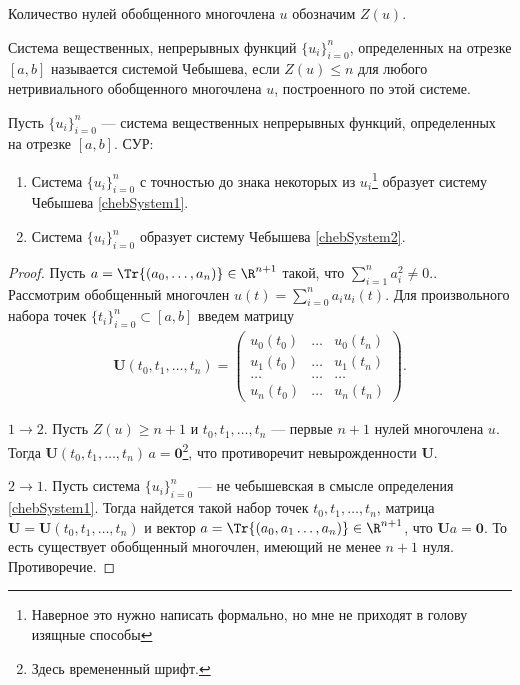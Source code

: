 Количество нулей обобщенного многочлена $u$ обозначим $Z(u)$.
\begin{dfn}[Аксиоматическое]
    \label{chebSystem2}
    Система вещественных, непрерывных функций $\{u_i\}_{i=0}^n$, определенных на отрезке $[a, b]$ называется системой Чебышева,
    если $Z(u) \leqslant n$ для любого нетривиального обобщенного многочлена $u$, построенного по этой системе.
\end{dfn}



\begin{thm}
    \label{chebDefEqual}
    Пусть $\{u_i\}_{i=0}^n$ --- система вещественных непрерывных функций, определенных на отрезке $[a, b]$.
    СУР:
    \begin{enumerate}
        \item Система $\{u_i\}_{i=0}^n$ с точностью до знака некоторых из $u_i$\footnote{\color{blue} Наверное
            это нужно написать формально, но мне не приходят в голову изящные способы}  образует систему Чебышева \ref{chebSystem1}.
        \item Система $\{u_i\}_{i=0}^n$ образует систему Чебышева \ref{chebSystem2}.
    \end{enumerate}
\end{thm}
\begin{proof}
    Пусть $a = \Tr{(a_0, \ldots, a_n)} \in \R^{n + 1}$ такой, что $\sum_{i=1}^n a_i^2 \neq0$..
    Рассмотрим обобщенный многочлен $u(t) = \sum_{i=0}^n a_i u_i(t)$.
    Для произвольного набора точек $\{t_i\}_{i=0}^n \subset [a, b]$ введем матрицу
    \begin{gather*}
        \mathbf U(t_0, t_1, \ldots, t_n) =
        \begin{pmatrix}
            u_0(t_0) & \ldots & u_0(t_n) \\
            u_1(t_0) & \ldots & u_1(t_n) \\
            \ldots & \ldots & \ldots \\
            u_n(t_0) & \ldots & u_n(t_n)
        \end{pmatrix}.
    \end{gather*}

    $1 \rightarrow 2$.
        Пусть $Z(u) \geqslant n + 1$ и $t_0, t_1, \ldots, t_n$ --- первые $n + 1$ нулей многочлена $u$.
        Тогда $\mathbf U(t_0, t_1, \ldots, t_n) \, a = \mathbf 0$\footnote{\color{blue} Здесь времененный шрифт.},
        что противоречит невырожденности $\mathbf U$.

    $2 \rightarrow 1$.
        Пусть система $\{u_i\}_{i=0}^n$ --- не чебышевская в смысле определения \ref{chebSystem1}.
        Тогда найдется такой набор точек $t_0, t_1, \ldots, t_n$,
        матрица $\mathbf U = \mathbf U(t_0, t_1, \ldots, t_n)$ и
        вектор $a = \Tr{(a_0, a_1 \ldots, a_n)} \in \R^{n + 1}$, что $\mathbf U a = \mathbf 0$.
        То есть существует обобщенный многочлен, имеющий не менее $n + 1$ нуля. Противоречие.
\end{proof}

